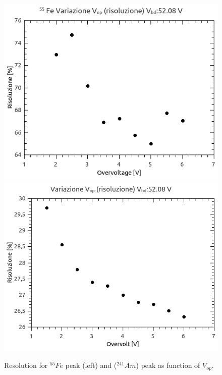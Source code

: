 \documentclass[10pt,a4paper, openany]{book}
\begin{document}
\begin{figure}[!h]
\begin{center}
\includegraphics[scale=0.35]{imm/resfe.png}
\includegraphics[scale=0.35]{imm/resam.png}
\end{center}
\caption{Resolution for $^{55}Fe$ peak (left) and ($^{241}Am$) peak as function of $V_{op}$.} 
\label{fig:res}
\end{figure}
\end{document}

